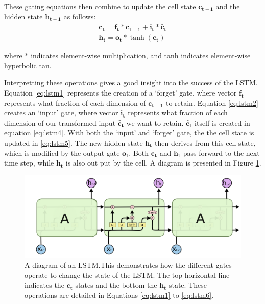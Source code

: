 These gating equations then combine to update the cell state $\mathbf{c_{t-1}}$ and the hidden state $\mathbf{h_{t-1}}$ as follows: 
\begin{align}
    \mathbf{c_t} = \mathbf{f_t} * \mathbf{c_{t-1}} + \mathbf{i_t} * \mathbf{\tilde{c_t}} \label{eq:lstm5}\\
    \mathbf{h_t} = \mathbf{o_t} * \tanh(\mathbf{c_t}) \label{eq:lstm6}
\end{align}

where  $*$ indicates element-wise multiplication, and tanh indicates element-wise hyperbolic tan.

Interpretting these operations gives a good insight into the success of the LSTM.  
Equation \ref{eq:lstm1} represents the creation of a `forget' gate, where vector $\mathbf{f_t}$ represents what fraction of each dimension of $\mathbf{c_{t-1}}$ to retain. 
Equation \ref{eq:lstm2}  creates an `input' gate, where vector $\mathbf{i_t}$ represents what fraction of each dimension of our transformed input $\mathbf{\tilde{c_{t}}}$ we want to retain.  
$\mathbf{\tilde{c_{t}}}$ itself is created in equation \ref{eq:lstm4}. With both the `input' and `forget' gate, the  the cell state is updated in \ref{eq:lstm5}. 
The new hidden state $\mathbf{h_{t}}$ then derives from this cell state, which is modified by the output gate $\mathbf{o_t}$. 
Both $\mathbf{c_{t}}$ and $\mathbf{h_{t}}$ pass forward to the next time step, while $\mathbf{h_{t}}$ is also out put by the cell. 
A diagram is presented in Figure \ref{fig:lstm_colah}.

\begin{figure}[tb]
    \centering
    \includegraphics[width=\linewidth]{ModelPics/LSTMcolah.png}
    \caption{A diagram of an LSTM.\protect\footnotemark This demonstrates how the different gates operate to change the state of the LSTM. The top horizontal line indicates the $\mathbf{c_t}$ states and the bottom the $\mathbf{h_t}$ state. These operations are detailed in Equations \ref{eq:lstm1} to \ref{eq:lstm6}.}
    \label{fig:lstm_colah}{}
\end{figure}

